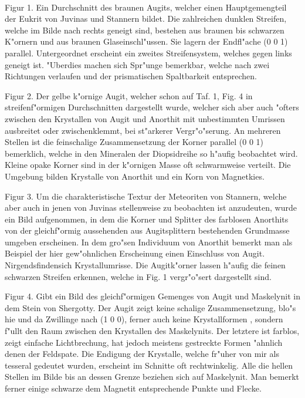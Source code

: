 \documentclass[a4paper, 11pt, oneside, polutonikogreek, german]{article}
\begin{document}
\paragraph{}
Figur 1. Ein Durchschnitt des braunen Augits, welcher einen Hauptgemengteil der Eukrit von Juvinas und Stannern bildet. Die zahlreichen dunklen Streifen, welche im Bilde nach rechts geneigt sind, bestehen aus braunen bis schwarzen K"ornern und aus braunen Glaseinschl"ussen. Sie lagern der Endfl"ache (0 0 1) parallel. Untergeordnet erscheint ein zweites Streifensystem, welches gegen links geneigt ist. "Uberdies machen sich Spr"unge bemerkbar, welche nach zwei Richtungen verlaufen und der prismatischen Spaltbarkeit entsprechen.

Figur 2. Der gelbe k"ornige Augit, welcher schon auf Taf. 1, Fig. 4 in streifenf"ormigen Durchschnitten dargestellt wurde, welcher sich aber auch "ofters zwischen den Krystallen von Augit und Anorthit mit unbestimmten Umrissen ausbreitet oder zwischenklemmt, bei st"arkerer Vergr"o"serung. An mehreren Stellen ist die feinschalige Zusammensetzung der Korner parallel (0 0 1) bemerklich, welche in den Mineralen der Diopsidreihe so h"aufig beobachtet wird. Kleine opake Korner sind in der k"ornigen Masse oft schwarmweise verteilt. Die Umgebung bilden Krystalle von Anorthit und ein Korn von Magnetkies.

Figur 3. Um die charakteristische Textur der Meteoriten von Stannern, welche aber auch in jenen von Juvinas stellenweise zu beobachten ist anzudeuten, wurde ein Bild aufgenommen, in dem die Korner und Splitter des farblosen Anorthits von der gleichf"ormig aussehenden aus Augitsplittern bestehenden Grundmasse umgeben erscheinen. In dem gro"sen Individuum von Anorthit bemerkt man als Beispiel der hier gew"ohnlichen Erscheinung einen Einschluss von Augit. Nirgendsfindensich Krystallumrisse. Die Augitk"orner lassen h"aufig die feinen schwarzen Streifen erkennen, welche in Fig. 1 vergr"o"sert dargestellt sind.

Figur 4. Gibt ein Bild des gleichf"ormigen Gemenges von Augit und Maskelynit in dem Stein von Shergotty. Der Augit zeigt keine schalige Zusammensetzung, blo"s hie und da Zwillinge nach (1 0 0), ferner auch keine Krystallformen , sondern f"ullt den Raum zwischen den Krystallen des Maskelynits. Der letztere ist farblos, zeigt einfache Lichtbrechung, hat jedoch meistens gestreckte Formen "ahnlich denen der Feldspate. Die Endigung der Krystalle, welche fr"uher von mir als tesseral gedeutet wurden, erscheint im Schnitte oft rechtwinkelig. Alle die hellen Stellen im Bilde bis an dessen Grenze beziehen sich auf Maskelynit. Man bemerkt ferner einige schwarze dem Magnetit entsprechende Punkte und Flecke.
\clearpage
\end{document}
